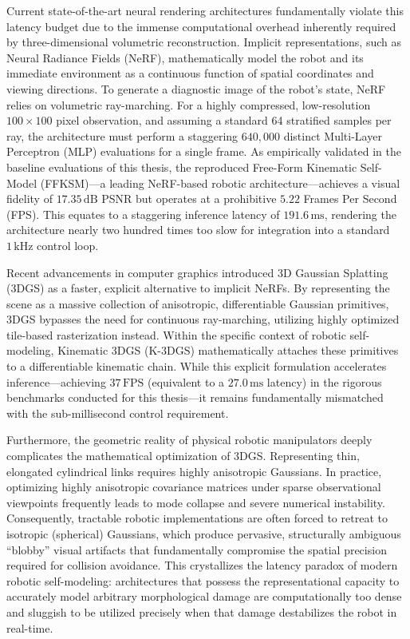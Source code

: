 \documentclass[12pt,a4paper,oneside]{report}
\begin{document}
Current state-of-the-art neural rendering architectures fundamentally violate this latency budget due to the immense computational overhead inherently required by three-dimensional volumetric reconstruction. Implicit representations, such as Neural Radiance Fields (NeRF), mathematically model the robot and its immediate environment as a continuous function of spatial coordinates and viewing directions. To generate a diagnostic image of the robot's state, NeRF relies on volumetric ray-marching. For a highly compressed, low-resolution $100 \times 100$ pixel observation, and assuming a standard 64 stratified samples per ray, the architecture must perform a staggering $640,000$ distinct Multi-Layer Perceptron (MLP) evaluations for a single frame. As empirically validated in the baseline evaluations of this thesis, the reproduced Free-Form Kinematic Self-Model (FFKSM)—a leading NeRF-based robotic architecture—achieves a visual fidelity of $17.35\,\mathrm{dB}$ PSNR but operates at a prohibitive $5.22$ Frames Per Second (FPS). This equates to a staggering inference latency of $191.6\,\mathrm{ms}$, rendering the architecture nearly two hundred times too slow for integration into a standard $1\,\mathrm{kHz}$ control loop.

Recent advancements in computer graphics introduced 3D Gaussian Splatting (3DGS) as a faster, explicit alternative to implicit NeRFs. By representing the scene as a massive collection of anisotropic, differentiable Gaussian primitives, 3DGS bypasses the need for continuous ray-marching, utilizing highly optimized tile-based rasterization instead. Within the specific context of robotic self-modeling, Kinematic 3DGS (K-3DGS) mathematically attaches these primitives to a differentiable kinematic chain. While this explicit formulation accelerates inference—achieving $37\,\mathrm{FPS}$ (equivalent to a $27.0\,\mathrm{ms}$ latency) in the rigorous benchmarks conducted for this thesis—it remains fundamentally mismatched with the sub-millisecond control requirement. 

Furthermore, the geometric reality of physical robotic manipulators deeply complicates the mathematical optimization of 3DGS. Representing thin, elongated cylindrical links requires highly anisotropic Gaussians. In practice, optimizing highly anisotropic covariance matrices under sparse observational viewpoints frequently leads to mode collapse and severe numerical instability. Consequently, tractable robotic implementations are often forced to retreat to isotropic (spherical) Gaussians, which produce pervasive, structurally ambiguous ``blobby'' visual artifacts that fundamentally compromise the spatial precision required for collision avoidance. This crystallizes the latency paradox of modern robotic self-modeling: architectures that possess the representational capacity to accurately model arbitrary morphological damage are computationally too dense and sluggish to be utilized precisely when that damage destabilizes the robot in real-time.
\end{document}
